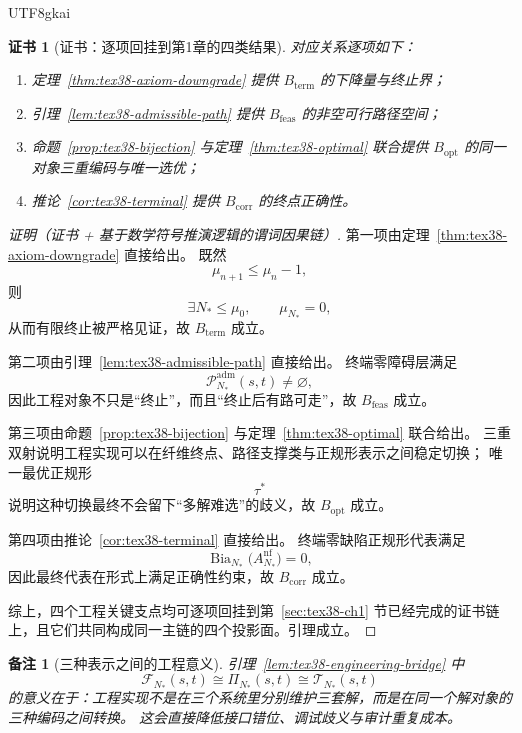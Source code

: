 \documentclass[12pt]{article}
\newtheorem{remark}{备注}[section]
\newtheorem{Certificate}{证书}[section]
\newcommand{\Bia}{\operatorname{Bia}}
\begin{document}
\begin{CJK*}{UTF8}{gkai}
\begin{Certificate}[证书：逐项回挂到第1章的四类结果]
\label{cert:tex38-engineering-bridge}
对应关系逐项如下：
\begin{enumerate}
  \item 定理~\ref{thm:tex38-axiom-downgrade} 提供 $B_{\mathrm{term}}$ 的下降量与终止界；
  \item 引理~\ref{lem:tex38-admissible-path} 提供 $B_{\mathrm{feas}}$ 的非空可行路径空间；
  \item 命题~\ref{prop:tex38-bijection} 与定理~\ref{thm:tex38-optimal} 联合提供 $B_{\mathrm{opt}}$ 的同一对象三重编码与唯一选优；
  \item 推论~\ref{cor:tex38-terminal} 提供 $B_{\mathrm{corr}}$ 的终点正确性。
\end{enumerate}
\end{Certificate}

\begin{proof}[证明（证书 + 基于数学符号推演逻辑的谓词因果链）]
第一项由定理~\ref{thm:tex38-axiom-downgrade} 直接给出。
既然
\[
  \mu_{n+1}\le\mu_n-1,
\]
则
\[
  \exists N_\ast\le\mu_0,\qquad \mu_{N_\ast}=0,
\]
从而有限终止被严格见证，故 $B_{\mathrm{term}}$ 成立。

第二项由引理~\ref{lem:tex38-admissible-path} 直接给出。
终端零障碍层满足
\[
  \mathcal{P}_{N_\ast}^{\mathrm{adm}}(s,t)\neq\varnothing,
\]
因此工程对象不只是“终止”，而且“终止后有路可走”，故 $B_{\mathrm{feas}}$ 成立。

第三项由命题~\ref{prop:tex38-bijection} 与定理~\ref{thm:tex38-optimal} 联合给出。
三重双射说明工程实现可以在纤维终点、路径支撑类与正规形表示之间稳定切换；
唯一最优正规形
\[
  \tau^\ast
\]
说明这种切换最终不会留下“多解难选”的歧义，故 $B_{\mathrm{opt}}$ 成立。

第四项由推论~\ref{cor:tex38-terminal} 直接给出。
终端零缺陷正规形代表满足
\[
  \Bia_{N_\ast}\bigl(A_{N_\ast}^{\mathrm{nf}}\bigr)=0,
\]
因此最终代表在形式上满足正确性约束，故 $B_{\mathrm{corr}}$ 成立。

综上，四个工程关键支点均可逐项回挂到第~\ref{sec:tex38-ch1} 节已经完成的证书链上，且它们共同构成同一主链的四个投影面。引理成立。
\end{proof}

\begin{remark}[三种表示之间的工程意义]
引理~\ref{lem:tex38-engineering-bridge} 中
\[
  \mathcal{F}_{N_\ast}(s,t)\cong \Pi_{N_\ast}(s,t)\cong \mathcal{T}_{N_\ast}(s,t)
\]
的意义在于：工程实现不是在三个系统里分别维护三套解，而是在同一个解对象的三种编码之间转换。
这会直接降低接口错位、调试歧义与审计重复成本。
\end{remark}


\end{CJK*}
\end{document}
